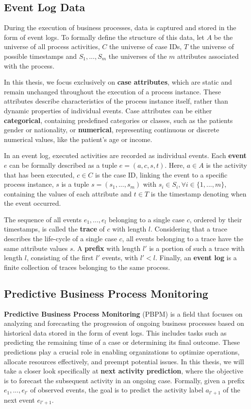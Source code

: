 \subsection{Event Log Data}
\label{sec:event_log}
During the execution of business processes, data is captured and stored in the form of event logs.
To formally define the structure of this data,
let $A$ be the universe of all process activities,
$C$ the universe of case IDs,
$T$ the universe of possible timestamps
and $S_1, ..., S_m$ the universes of the $m$ attributes associated with the process.

In this thesis, we focus exclusively on \textbf{case attributes},
which are static and remain unchanged throughout the execution of a process instance.
These attributes describe characteristics of the process instance itself,
rather than dynamic properties of individual events.
Case attributes can be either \textbf{categorical},
containing predefined categories or classes, such as the patients gender or nationality,
or \textbf{numerical}, representing continuous or discrete numerical values, like the patient's age or income. 

In an event log, executed activities are recorded as individual events.
Each \textbf{event} $e$ can be formally described as a tuple $e = (a, c, s, t)$.
Here, $a \in A$ is the activity that has been executed,
$c \in C$ is the case ID, linking the event to a specific process instance,
$s$ is a tuple $s = (s_1, ..., s_m)$ with $s_i \in S_i, \forall i \in \{1, ..., m\}$,
containing the values of each attribute
and $t \in T$ is the timestamp denoting when the event occurred.

The sequence of all events $e_1, ..., e_l$ belonging to a single case $c$,
ordered by their timestamps, is called the \textbf{trace} of $c$ with length $l$.
Considering that a trace describes the life-cycle of a single case $c$,
all events belonging to a trace have the same attribute values $s$.
A \textbf{prefix} with length $l'$ is a portion of such a trace with length $l$,
consisting of the first $l'$ events, with $l' < l$.
Finally, an \textbf{event log} is a finite collection of traces belonging to the same process.


\subsection{Predictive Business Process Monitoring}
\textbf{Predictive Business Process Monitoring} (PBPM) is a field that focuses on analyzing
and forecasting the progression of ongoing business processes
based on historical data stored in the form of event logs. 
This includes tasks such as predicting the remaining time of a case or determining its final outcome.
These predictions play a crucial role in enabling organizations to optimize operations,
allocate resources effectively, and preempt potential issues.
In this thesis, we will take a closer look specifically at \textbf{next activity prediction},
where the objective is to forecast the subsequent activity in an ongoing case.
Formally, given a prefix $e_1, ..., e_{l'}$ of observed events,
the goal is to predict the activity label $a_{l'+1}$ of the next event
$e_{l'+1}$.

